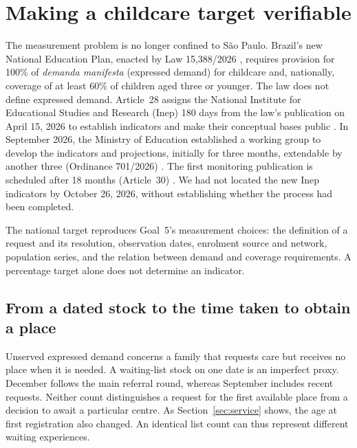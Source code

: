 
\section{Making a childcare target verifiable}\label{sec:indicators}

The measurement problem is no longer confined to S\~ao Paulo. Brazil's new National Education Plan, enacted by Law 15,388/2026 \citep{brasil2026pne}, requires provision for 100\% of \emph{demanda manifesta} (expressed demand) for childcare and, nationally, coverage of at least 60\% of children aged three or younger. The law does not define expressed demand. Article~28 assigns the National Institute for Educational Studies and Research (Inep) 180 days from the law's publication on April 15, 2026 to establish indicators and make their conceptual bases public \citep{brasil2026pne}. In September 2026, the Ministry of Education established a working group to develop the indicators and projections, initially for three months, extendable by another three (Ordinance 701/2026) \citep{mec2026portaria701}. The first monitoring publication is scheduled after 18 months (Article~30) \citep{brasil2026pne}. We had not located the new Inep indicators by October 26, 2026, without establishing whether the process had been completed.

The national target reproduces Goal~5's measurement choices: the definition of a request and its resolution, observation dates, enrolment source and network, population series, and the relation between demand and coverage requirements. A percentage target alone does not determine an indicator.

\subsection{From a dated stock to the time taken to obtain a place}

Unserved expressed demand concerns a family that requests care but receives no place when it is needed. A waiting-list stock on one date is an imperfect proxy. December follows the main referral round, whereas September includes recent requests. Neither count distinguishes a request for the first available place from a decision to await a particular centre. As Section~\ref{sec:service} shows, the age at first registration also changed. An identical list count can thus represent different waiting experiences.

